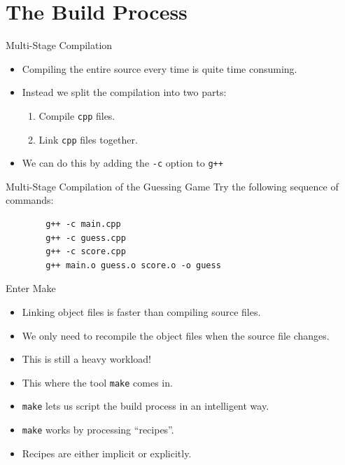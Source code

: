 \documentclass[]{beamer}
\begin{document}
\section{The Build Process}

\begin{frame}{Multi-Stage Compilation}
\begin{itemize}[<+->]
    \item Compiling the entire source every time is quite
    time consuming.
    \item Instead we split the compilation into two parts:
    \begin{enumerate}
        \item Compile \texttt{cpp} files.
        \item Link \texttt{cpp} files together.
    \end{enumerate}
    \item We can do this by adding the \texttt{-c} option to
        \texttt{g++}
\end{itemize}
\end{frame}

\begin{frame}[fragile]{Multi-Stage Compilation of the Guessing Game}
    Try the following sequence of commands:
    \begin{BVerbatim}
        g++ -c main.cpp
        g++ -c guess.cpp
        g++ -c score.cpp
        g++ main.o guess.o score.o -o guess
    \end{BVerbatim}
\end{frame}

\begin{frame}{Enter Make}
\begin{itemize}[<+->]
    \item Linking object files is faster than compiling source files.
    \item We only need to recompile the object files when the source
        file changes.
    \item This is still a heavy workload!
    \item This where the tool \texttt{make} comes in.
    \item \texttt{make} lets us script the build process in an
        intelligent way.
    \item \texttt{make} works by processing ``recipes''.
    \item Recipes are either implicit or explicitly.
\end{itemize}
\end{frame}
\end{document}
